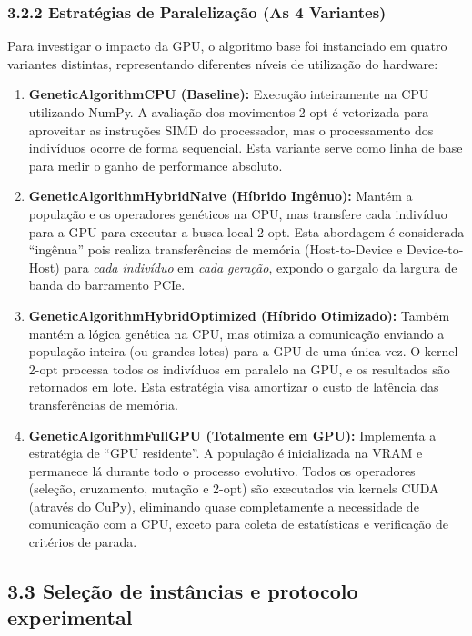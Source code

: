 \subsubsection{3.2.2 Estratégias de Paralelização (As 4
Variantes)}\label{sec-322-variantes}

Para investigar o impacto da GPU, o algoritmo base foi instanciado em
quatro variantes distintas, representando diferentes níveis de
utilização do hardware:

\begin{enumerate}
\def\labelenumi{\arabic{enumi}.}
\item
  \textbf{GeneticAlgorithmCPU (Baseline):} Execução inteiramente na CPU
  utilizando NumPy. A avaliação dos movimentos 2-opt é vetorizada para
  aproveitar as instruções SIMD do processador, mas o processamento dos
  indivíduos ocorre de forma sequencial. Esta variante serve como linha
  de base para medir o ganho de performance absoluto.
\item
  \textbf{GeneticAlgorithmHybridNaive (Híbrido Ingênuo):} Mantém a
  população e os operadores genéticos na CPU, mas transfere cada
  indivíduo para a GPU para executar a busca local 2-opt. Esta abordagem
  é considerada ``ingênua'' pois realiza transferências de memória
  (Host-to-Device e Device-to-Host) para \emph{cada indivíduo} em
  \emph{cada geração}, expondo o gargalo da largura de banda do
  barramento PCIe.
\item
  \textbf{GeneticAlgorithmHybridOptimized (Híbrido Otimizado):} Também
  mantém a lógica genética na CPU, mas otimiza a comunicação enviando a
  população inteira (ou grandes lotes) para a GPU de uma única vez. O
  kernel 2-opt processa todos os indivíduos em paralelo na GPU, e os
  resultados são retornados em lote. Esta estratégia visa amortizar o
  custo de latência das transferências de memória.
\item
  \textbf{GeneticAlgorithmFullGPU (Totalmente em GPU):} Implementa a
  estratégia de ``GPU residente''. A população é inicializada na VRAM e
  permanece lá durante todo o processo evolutivo. Todos os operadores
  (seleção, cruzamento, mutação e 2-opt) são executados via kernels CUDA
  (através do CuPy), eliminando quase completamente a necessidade de
  comunicação com a CPU, exceto para coleta de estatísticas e
  verificação de critérios de parada.
\end{enumerate}

\subsection{3.3 Seleção de instâncias e protocolo
experimental}\label{sec-33-selecao-instancias}


